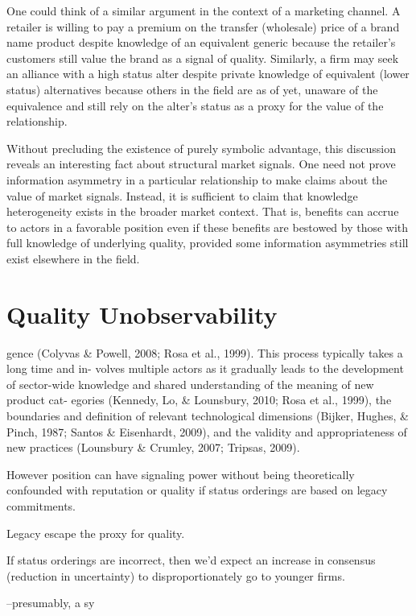 One could think of a similar argument in the context of a marketing channel. A retailer is willing to pay a premium on the transfer (wholesale) price of a brand name product despite knowledge of an equivalent generic because the retailer's customers still value the brand as a signal of quality. Similarly, a firm may seek an alliance with a high status alter despite private knowledge of equivalent (lower status) alternatives because others in the field are as of yet, unaware of the equivalence and still rely on the alter's status as a proxy for the value of the relationship.  

Without precluding the existence of purely symbolic advantage, this discussion reveals an interesting fact about structural market signals. One need not prove information asymmetry in a particular relationship to make claims about the value of market signals. Instead, it is sufficient to claim that knowledge heterogeneity exists in the broader market context. That is, benefits can accrue to actors in a favorable position even if these benefits are bestowed by those with full knowledge of underlying quality, provided some information asymmetries still exist elsewhere in the field.  

\section{Quality Unobservability}


gence (Colyvas \& Powell, 2008; Rosa et al., 1999). This process typically takes a long time and in- volves multiple actors as it gradually leads to the development of sector-wide knowledge and shared understanding of the meaning of new product cat- egories (Kennedy, Lo, \& Lounsbury, 2010; Rosa et al., 1999), the boundaries and definition of relevant technological dimensions (Bijker, Hughes, \& Pinch, 1987; Santos \& Eisenhardt, 2009), and the validity and appropriateness of new practices (Lounsbury \& Crumley, 2007; Tripsas, 2009).

However position can have signaling power without being theoretically confounded with reputation or quality if status orderings are based on legacy commitments.

Legacy escape the proxy for quality.

If status orderings are incorrect, then we'd expect an increase in consensus (reduction in uncertainty) to disproportionately go to younger firms.

 --presumably, a sy

